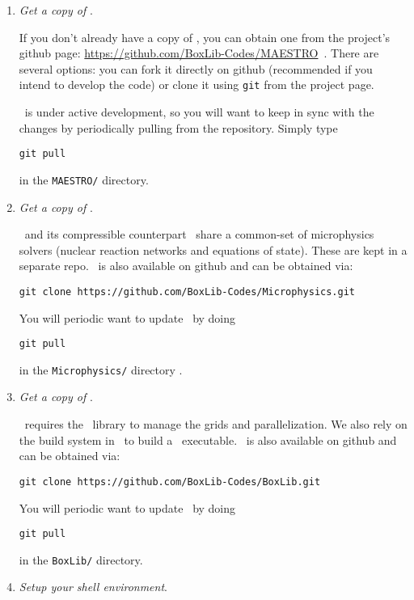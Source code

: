\begin{enumerate}

\item {\em Get a copy of \maestro}.

  If you don't already have a copy of \maestro, you can obtain one
  from the project's {\sf github} page:
  \url{https://github.com/BoxLib-Codes/MAESTRO}\, .  There are several
  options: you can fork it directly on {\sf github} (recommended if
  you intend to develop the code) or clone it using {\tt git} from the
  project page.

  \maestro\ is under active development, so you will want to keep in
  sync with the changes by periodically pulling from the repository.
  Simply type
  \begin{verbatim}
git pull
  \end{verbatim}
  in the {\tt MAESTRO/} directory.

\item {\em Get a copy of \microphysics}.

  \maestro\ and its compressible counterpart \castro\ share a
  common-set of microphysics solvers (nuclear reaction networks and
  equations of state).  These are kept in a separate repo.
  \microphysics\ is also available on github and can be obtained 
  via:
  \begin{verbatim}
git clone https://github.com/BoxLib-Codes/Microphysics.git
  \end{verbatim}

  You will periodic want to update \microphysics\ by doing
  \begin{verbatim}
git pull
  \end{verbatim}
  in the {\tt Microphysics/} directory
.
\item {\em Get a copy of \boxlib}.

  \maestro\ requires the \boxlib\ library to manage the grids and
  parallelization.  We also rely on the build system in \boxlib\ to
  build a \maestro\ executable.  \boxlib\ is also available on github
  and can be obtained via:
  \begin{verbatim}
git clone https://github.com/BoxLib-Codes/BoxLib.git
  \end{verbatim}

  You will periodic want to update \boxlib\ by doing
  \begin{verbatim}
git pull
  \end{verbatim}
  in the {\tt BoxLib/} directory.


\item {\em Setup your shell environment}.


\end{enumerate}
